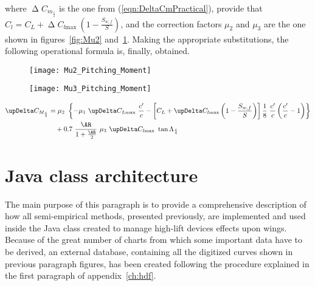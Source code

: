 where $\upDelta C_{m_{\frac{c}{4}}}$ is the one from (\ref{eqn:DeltaCmPractical}), provide that $C_l=C_L+\upDelta C_{l\text{max}}\ \left(1-\frac{S_{w,f}}{S}\right)$, and the correction factors $\mu_2$ and $\mu_3$ are the one shown in figures~\ref{fig:Mu2} and~\ref{fig:Mu3}. Making the appropriate substitutions, the following operational formula is, finally, obtained.

\begin{figure}[!t]
\centering
\begin{minipage}{.5\textwidth}
  \centering
  \texttt{[image: Mu2\_Pitching\_Moment]}
  \label{fig:Mu2}
\end{minipage}%
\begin{minipage}{.5\textwidth}
  \centering
  \texttt{[image: Mu3\_Pitching\_Moment]}
  \label{fig:Mu3}
\end{minipage}
\end{figure}

\begin{equation}
\begin{split}
\upDelta C_{M_{\frac{c}{4}}}&=\mu_2\ \left\{-\mu_1\ \upDelta C_{L\text{max}}\ \dfrac{c'}{c}-\left[C_L+\upDelta C_{l\text{max}}\left(1-\dfrac{S_{w,f}}{S}\right)\right]\dfrac{1}{8}\ \dfrac{c'}{c}\left(\dfrac{c'}{c}-1\right)\right\}\\
&\quad+0.7\ \dfrac{\AR}{1+\frac{\AR}{2}}\ \mu_3\ \upDelta C_{l\text{max}}\ \tan\Lambda_{\frac{c}{4}}
\label{eqn:DeltaCMPractical}
\end{split}
\end{equation}

\section{Java class architecture}
The main purpose of this paragraph is to provide a comprehensive description of how all semi-empirical methods, presented previously, are implemented and used inside the Java class created to manage high-lift devices effects upon wings. Because of the great number of charts from which some important data have to be derived, an external database, containing all the digitized curves shown in previous paragraph figures, has been created following the procedure explained in the first paragraph of appendix~\ref{ch:hdf}.

